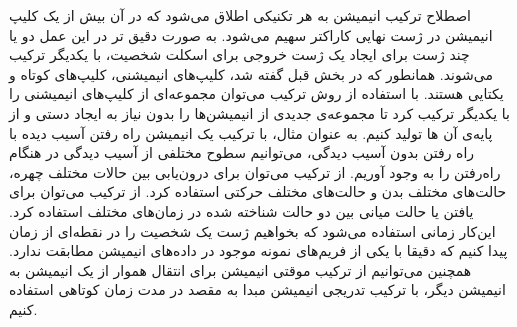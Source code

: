 اصطلاح ترکیب انیمیشن به هر تکنیکی اطلاق می‌شود که در آن بیش از یک کلیپ انیمیشن در ژست نهایی کاراکتر سهیم می‌شود.
به صورت دقیق تر در این عمل دو یا چند ژست برای ایجاد یک ژست خروجی برای اسکلت شخصیت، با یکدیگر ترکیب می‌شوند.
همانطور که در بخش قبل گفته شد، کلیپ‌های انیمیشنی، کلیپ‌های کوتاه و یکتایی هستند. با استفاده از روش ترکیب ‌می‌توان مجموعه‌ای از کلیپ‌های انیمیشنی را با یکدیگر ترکیب کرد تا مجموعه‌ی جدیدی از انیمیشن‌ها را بدون نیاز به ایجاد دستی و از پایه‌ی آن ها تولید کنیم.
به عنوان مثال، با ترکیب یک انیمیشن راه رفتن آسیب دیده با راه رفتن بدون آسیب دیدگی، می‌توانیم سطوح مختلفی از آسیب دیدگی در هنگام راه‌رفتن را به وجود آوریم.
از ترکیب می‌توان برای درون‌یابی بین حالات مختلف چهره، حالت‌های مختلف بدن و حالت‌های مختلف حرکتی استفاده کرد.
از ترکیب می‌توان برای یافتن یا حالت میانی بین دو حالت شناخته شده در زمان‌های مختلف استفاده کرد. این‌کار زمانی استفاده می‌شود که بخواهیم ژست یک شخصیت را در نقطه‌ای از زمان پیدا کنیم که دقیقا با یکی از فریم‌های نمونه موجود در داده‌های انیمیشن مطابقت ندارد.
همچنین می‌توانیم از ترکیب موقتی انیمیشن برای انتقال هموار از یک انیمیشن به انیمیشن دیگر، با ترکیب تدریجی انیمیشن مبدا به مقصد در مدت زمان کوتاهی استفاده کنیم.